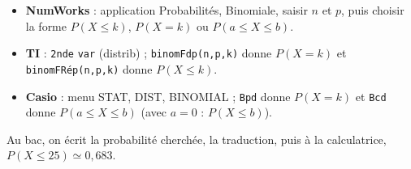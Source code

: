 \documentclass[11pt,a4paper]{article}
\renewcommand{\approx}{\simeq}
\begin{document}
\begin{remarquebox}
\begin{itemize}
  \item \textbf{NumWorks} : application Probabilités, Binomiale, saisir $n$ et $p$, puis
        choisir la forme $P(X\leq k)$, $P(X=k)$ ou $P(a\leq X\leq b)$.
  \item \textbf{TI} : \texttt{2nde} \texttt{var} (distrib) ; \texttt{binomFdp(n,p,k)}
        donne $P(X=k)$ et \texttt{binomFRép(n,p,k)} donne $P(X\leq k)$.
  \item \textbf{Casio} : menu STAT, DIST, BINOMIAL ; \texttt{Bpd} donne $P(X=k)$ et
        \texttt{Bcd} donne $P(a\leq X\leq b)$ (avec $a=0$ : $P(X\leq b)$).
\end{itemize}
Au bac, on écrit la probabilité cherchée, la traduction, puis \og à la calculatrice,
$P(X\leq 25)\approx 0{,}683$\fg.
\end{remarquebox}
\end{document}
